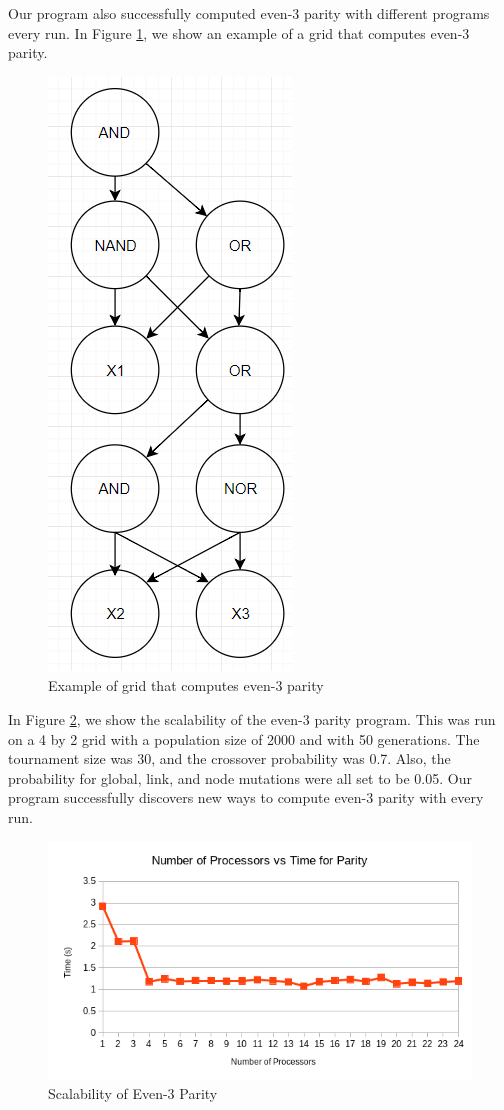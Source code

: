 \documentclass{article}
\begin{document}
	Our program also successfully computed even-3 parity with different programs every run. In Figure \ref{parityex}, we show an example of a grid that computes even-3 parity.

	\begin{figure}
		\centering
		\includegraphics{parity1.png}
		\caption{Example of grid that computes even-3 parity}
		\label{parityex}
	\end{figure}
	
	In Figure \ref{parity_scalability}, we show the scalability of the even-3 parity program. This was run on a 4 by 2 grid with a population size of 2000 and with 50 generations. The tournament size was 30, and the crossover probability was 0.7. Also, the probability for global, link, and node mutations were all set to be 0.05. Our program successfully discovers new ways to compute even-3 parity with every run.

\begin{figure}
	\centering
	\includegraphics[width=\textwidth]{parity_scalability.png}
	\caption{Scalability of Even-3 Parity}
	\label{parity_scalability}
\end{figure}
	
\end{document}
